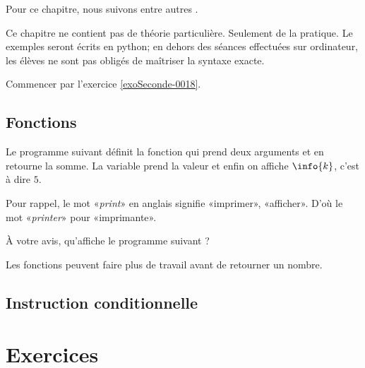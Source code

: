 
Pour ce chapitre, nous suivons entre autres \cite{oklaEg}.

Ce chapitre ne contient pas de théorie particulière. Seulement de la pratique. Le exemples seront écrits en python; en dehors des séances effectuées sur ordinateur, les élèves ne sont pas obligés de maîtriser la syntaxe exacte.

Commencer par l'exercice \ref{exoSeconde-0018}.

\subsection{Fonctions}

Le programme suivant définit la fonction  qui prend deux arguments et en retourne la somme. La variable  prend la valeur  et enfin on affiche \( \info{k}\), c'est à dire \( 5\).


Pour rappel, le mot «\emph{print}» en anglais signifie «imprimer», «afficher». D'où le mot «\emph{printer}» pour «imprimante».

À votre avis, qu'affiche le programme suivant ?


Les fonctions peuvent faire plus de travail avant de retourner un nombre.



\subsection{Instruction conditionnelle}

\section{Exercices}

